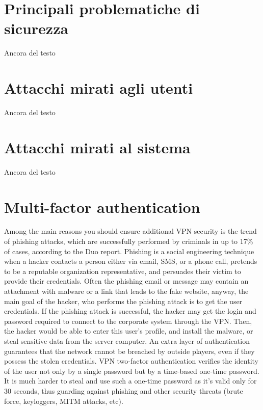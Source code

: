 \section{Principali problematiche di sicurezza}
Ancora del testo

\section{Attacchi mirati agli utenti}
Ancora del testo

\section{Attacchi mirati al sistema}
Ancora del testo

\section{Multi-factor authentication}
Among the main reasons you should ensure additional VPN security is the trend of phishing attacks, which are successfully performed by criminals in up to 17\% of cases, according to the Duo report.
Phishing is a  social engineering technique when a hacker contacts a person either via email, SMS, or a phone call, pretends to be a reputable organization representative, and persuades their victim to provide their credentials. Often the phishing email or message may contain an attachment with malware or a link that leads to the fake website, anyway, the main goal of the hacker, who performs the phishing attack is to get the user credentials.
If the phishing attack is successful, the hacker may get the login and password required to connect to the corporate system through the VPN. Then, the hacker would be able to enter this user's profile, and install the malware, or steal sensitive data from the server computer.
An extra layer of authentication guarantees that the network cannot be breached by outside players, even if they possess the stolen credentials. VPN two-factor authentication verifies the identity of the user not only by a single password but by a time-based one-time password. It is much harder to steal and use such a one-time password as it's valid only for 30 seconds, thus guarding against phishing and other security threats (brute force, keyloggers, MITM attacks, etc).


